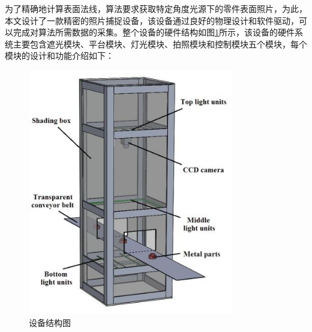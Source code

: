 为了精确地计算表面法线，算法要求获取特定角度光源下的零件表面照片，为此，本文设计了一款精密的照片捕捉设备，该设备通过良好的物理设计和软件驱动，可以完成对算法所需数据的采集。整个设备的硬件结构如图\ref{zheguangmokuai}所示，该设备的硬件系统主要包含遮光模块、平台模块、灯光模块、拍照模块和控制模块五个模块，每个模块的设计和功能介绍如下：
\begin{figure}[htbp]
\centering
\includegraphics[width=0.8\textwidth]{figures/zheguangmokuai.png}
\caption{设备结构图}\label{zheguangmokuai}
\end{figure}
